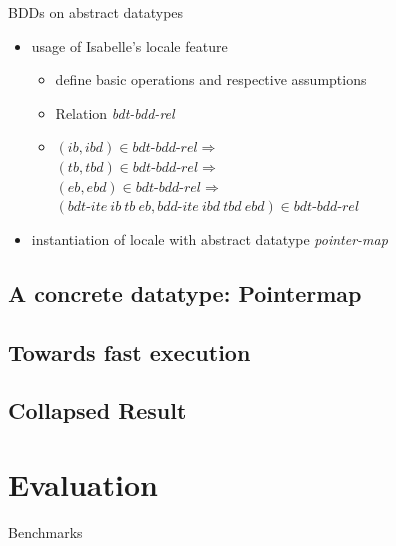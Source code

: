 \documentclass[%
	sans,
	12pt,
]{beamer}
\begin{document}
\begin{frame}{BDDs on abstract datatypes}
\begin{itemize}
  \item usage of Isabelle's locale feature
    \begin{itemize}
      \item define basic operations and respective assumptions
      \item Relation \textit{bdt-bdd-rel}
      \item $ (ib, ibd) \in \textit{bdt-bdd-rel}  \Longrightarrow $ \\
             $(tb, tbd) \in \textit{bdt-bdd-rel} \Longrightarrow $ \\
             $(eb, ebd) \in \textit{bdt-bdd-rel} \Longrightarrow $ \\
             $(\textit{bdt-ite}\ ib\ tb\ eb, \textit{bdd-ite}\ ibd\ tbd\ ebd) 
             \in \textit{bdt-bdd-rel} $
    \end{itemize}
  \item instantiation of locale with abstract datatype \textit{pointer-map}
\end{itemize}

\end{frame}

\subsection{A concrete datatype: Pointermap}
\subsection{Towards fast execution}
\subsection{Collapsed Result}
\begin{frame}
\end{frame}
\section{Evaluation}
\begin{frame}{Benchmarks}
\end{frame}
\end{document}
